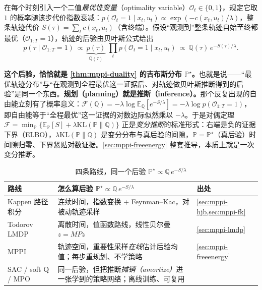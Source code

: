 \begin{definition}[最优性变量与规划即推断]\label{def:mppi-inference}
在每个时刻引入一个二值\emph{最优性变量}（optimality variable）$\mathcal{O}_t\in\{0,1\}$，规定它取 $1$ 的概率随该步代价指数衰减：$p(\mathcal{O}_t{=}1\mid x_t,u_t)\propto\exp(-c(x_t,u_t)/\lambda)$，整条轨迹代价 $S(\tau)=\sum_t c(x_t,u_t)$（含终端）。假设“观测到”整条轨迹自始至终都最优（$\mathcal{O}_{1:T}{=}1$），轨迹的后验由贝叶斯公式给出
\begin{equation}
  p(\tau\mid\mathcal{O}_{1:T}{=}1)\ \propto\ \underbrace{p(\tau)}_{\mathbb{Q}(\tau)}\;\prod_t p(\mathcal{O}_t{=}1\mid x_t,u_t)\ \propto\ \mathbb{Q}(\tau)\,e^{-S(\tau)/\lambda}.
  \label{eq:mppi-posterior}
\end{equation}
\end{definition}

\noindent \textbf{这个后验，恰恰就是 \cref{thm:mppi-duality} 的吉布斯分布 $\mathbb{P}^\star$。}也就是说——“最优轨迹分布”与“在观测到全程最优这一证据后、对轨迹做贝叶斯推断得到的后验”是同一个东西。\textbf{规划（planning）就是推断（inference）。}那个反复出现的自由能立刻有了概率意义：$\mathcal{F}(\mathbb{Q})=-\lambda\log\mathbb{E}_{\mathbb{Q}}[e^{-S/\lambda}]=-\lambda\log p(\mathcal{O}_{1:T}{=}1)$，即自由能等于“全程最优”这一证据的对数边际似然乘以 $-\lambda$。于是对偶定理 $\mathcal{F}=\min_{\mathbb{P}}\{\mathbb{E}_{\mathbb{P}}[S]+\lambda\mathrm{KL}(\mathbb{P}\|\mathbb{Q})\}$ 正是\emph{变分推断}的标准形式：右端是负的证据下界（ELBO），$\lambda\mathrm{KL}(\mathbb{P}\|\mathbb{Q})$ 是变分分布与真后验的间隙，$\mathbb{P}=\mathbb{P}^\star$（真后验）时间隙归零、下界紧贴对数证据。\cref{sec:mppi-freeenergy} 整套推导，本质上就是一次变分推断。

\begin{table}[H]\centering\small
\caption{四条路线，同一个后验 $\mathbb{P}^\star\propto\mathbb{Q}\,e^{-S/\lambda}$}
\label{tab:mppi-inference}
\begin{tabularx}{\linewidth}{lLl}
\toprule
路线 & 怎么算后验 $\mathbb{P}^\star\propto\mathbb{Q}\,e^{-S/\lambda}$ & 出处 \\
\midrule
Kappen 路径积分 & 连续时间，指数变换 + Feynman--Kac，对被动轨迹采样 & \cref{sec:mppi-hjb,sec:mppi-fk} \\
Todorov LMDP & 离散时间，值函数路线，线性贝尔曼 $z=MPz$ & \cref{sec:mppi-lmdp} \\
MPPI & 轨迹空间，重要性采样\emph{在线}估计后验均值；每步重规划、不学策略 & \cref{sec:mppi-freeenergy} \\
SAC / soft Q / MPO & 同一后验，但把推断\emph{摊销（amortize）}进一张学到的策略网络；离线训练、可复用 & \cite{haarnoja2018soft,abdolmaleki2018maximum} \\
\bottomrule
\end{tabularx}
\end{table}

